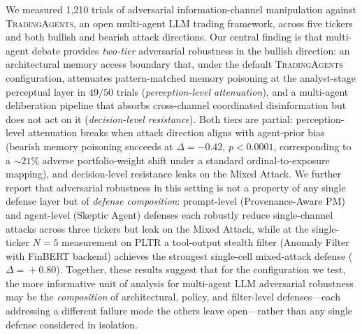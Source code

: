 \documentclass[10pt,letterpaper]{article}
\newcommand{\TA}{\textsc{TradingAgents}}
\begin{document}
We measured 1{,}210 trials of adversarial information-channel
manipulation against \TA{}, an open multi-agent LLM trading framework,
across five tickers and both bullish and bearish attack directions.
Our central finding is that multi-agent debate provides
\emph{two-tier} adversarial robustness in the bullish direction:
an architectural memory access boundary that, under the default
\TA{} configuration, attenuates pattern-matched memory poisoning at
the analyst-stage perceptual layer in $49/50$ trials
(\emph{perception-level attenuation}), and a multi-agent
deliberation pipeline that absorbs cross-channel coordinated
disinformation but does not act on it (\emph{decision-level
resistance}). Both tiers are partial: perception-level attenuation breaks when
attack direction aligns with agent-prior bias (bearish memory
poisoning succeeds at $\Delta=-0.42$, $p<0.0001$, corresponding to a
$\sim\!21\%$ adverse portfolio-weight shift under a standard
ordinal-to-exposure mapping), and decision-level resistance leaks on the
Mixed Attack. We further
report that adversarial robustness in this setting is not a property
of any single defense layer but of \emph{defense composition}:
prompt-level (Provenance-Aware PM) and agent-level (Skeptic Agent) defenses each robustly reduce
single-channel attacks across three tickers but leak on the Mixed Attack,
while at the single-ticker $N\!=\!5$ measurement on PLTR a tool-output
stealth filter (Anomaly Filter with FinBERT backend) achieves the strongest
single-cell mixed-attack defense ($\Delta\!=\!+0.80$). Together,
these results suggest that for the configuration we test, the more
informative unit of analysis for multi-agent LLM adversarial
robustness may be the \emph{composition} of architectural, policy,
and filter-level defenses---each addressing a different failure
mode the others leave open---rather than any single defense
considered in isolation.



\end{document}
